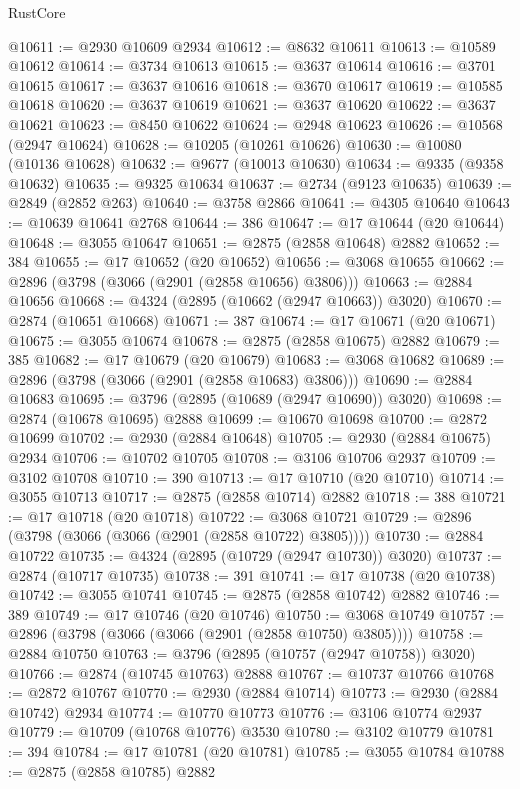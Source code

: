 \begin{lexlean}{RustCore}
\begin{coremodule}
@10611 := @2930 @10609 @2934
@10612 := @8632 @10611
@10613 := @10589 @10612
@10614 := @3734 @10613
@10615 := @3637 @10614
@10616 := @3701 @10615
@10617 := @3637 @10616
@10618 := @3670 @10617
@10619 := @10585 @10618
@10620 := @3637 @10619
@10621 := @3637 @10620
@10622 := @3637 @10621
@10623 := @8450 @10622
@10624 := @2948 @10623
@10626 := @10568 (@2947 @10624)
@10628 := @10205 (@10261 @10626)
@10630 := @10080 (@10136 @10628)
@10632 := @9677 (@10013 @10630)
@10634 := @9335 (@9358 @10632)
@10635 := @9325 @10634
@10637 := @2734 (@9123 @10635)
@10639 := @2849 (@2852 @263)
@10640 := @3758 @2866
@10641 := @4305 @10640
@10643 := @10639 @10641 @2768
@10644 := 386
@10647 := @17 @10644 (@20 @10644)
@10648 := @3055 @10647
@10651 := @2875 (@2858 @10648) @2882
@10652 := 384
@10655 := @17 @10652 (@20 @10652)
@10656 := @3068 @10655
@10662 := @2896 (@3798 (@3066 (@2901 (@2858 @10656) @3806)))
@10663 := @2884 @10656
@10668 := @4324 (@2895 (@10662 (@2947 @10663)) @3020)
@10670 := @2874 (@10651 @10668)
@10671 := 387
@10674 := @17 @10671 (@20 @10671)
@10675 := @3055 @10674
@10678 := @2875 (@2858 @10675) @2882
@10679 := 385
@10682 := @17 @10679 (@20 @10679)
@10683 := @3068 @10682
@10689 := @2896 (@3798 (@3066 (@2901 (@2858 @10683) @3806)))
@10690 := @2884 @10683
@10695 := @3796 (@2895 (@10689 (@2947 @10690)) @3020)
@10698 := @2874 (@10678 @10695) @2888
@10699 := @10670 @10698
@10700 := @2872 @10699
@10702 := @2930 (@2884 @10648)
@10705 := @2930 (@2884 @10675) @2934
@10706 := @10702 @10705
@10708 := @3106 @10706 @2937
@10709 := @3102 @10708
@10710 := 390
@10713 := @17 @10710 (@20 @10710)
@10714 := @3055 @10713
@10717 := @2875 (@2858 @10714) @2882
@10718 := 388
@10721 := @17 @10718 (@20 @10718)
@10722 := @3068 @10721
@10729 := @2896 (@3798 (@3066 (@3066 (@2901 (@2858 @10722) @3805))))
@10730 := @2884 @10722
@10735 := @4324 (@2895 (@10729 (@2947 @10730)) @3020)
@10737 := @2874 (@10717 @10735)
@10738 := 391
@10741 := @17 @10738 (@20 @10738)
@10742 := @3055 @10741
@10745 := @2875 (@2858 @10742) @2882
@10746 := 389
@10749 := @17 @10746 (@20 @10746)
@10750 := @3068 @10749
@10757 := @2896 (@3798 (@3066 (@3066 (@2901 (@2858 @10750) @3805))))
@10758 := @2884 @10750
@10763 := @3796 (@2895 (@10757 (@2947 @10758)) @3020)
@10766 := @2874 (@10745 @10763) @2888
@10767 := @10737 @10766
@10768 := @2872 @10767
@10770 := @2930 (@2884 @10714)
@10773 := @2930 (@2884 @10742) @2934
@10774 := @10770 @10773
@10776 := @3106 @10774 @2937
@10779 := @10709 (@10768 @10776) @3530
@10780 := @3102 @10779
@10781 := 394
@10784 := @17 @10781 (@20 @10781)
@10785 := @3055 @10784
@10788 := @2875 (@2858 @10785) @2882

\end{coremodule}
\end{lexlean}
